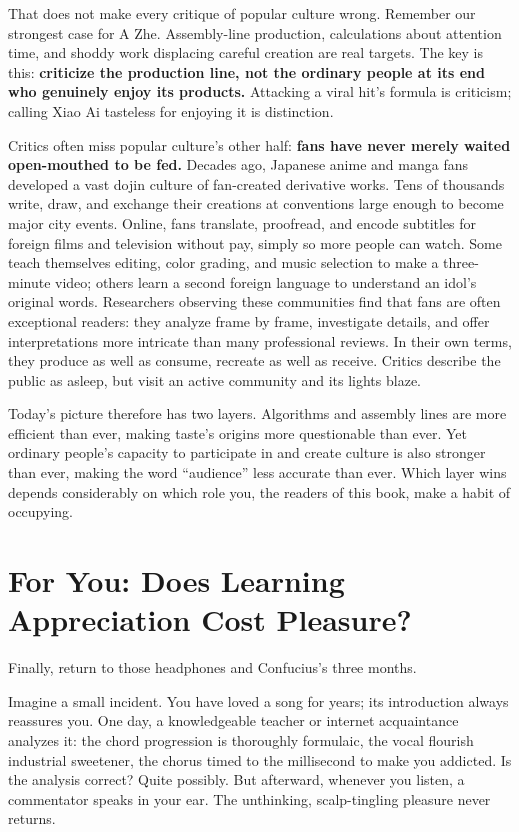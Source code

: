 That does not make every critique of popular culture wrong. Remember our strongest case for A Zhe. Assembly-line production, calculations about attention time, and shoddy work displacing careful creation are real targets. The key is this: \textbf{criticize the production line, not the ordinary people at its end who genuinely enjoy its products.} Attacking a viral hit's formula is criticism; calling Xiao Ai tasteless for enjoying it is distinction.

Critics often miss popular culture's other half: \textbf{fans have never merely waited open-mouthed to be fed.} Decades ago, Japanese anime and manga fans developed a vast dojin culture of fan-created derivative works. Tens of thousands write, draw, and exchange their creations at conventions large enough to become major city events. Online, fans translate, proofread, and encode subtitles for foreign films and television without pay, simply so more people can watch. Some teach themselves editing, color grading, and music selection to make a three-minute video; others learn a second foreign language to understand an idol's original words. Researchers observing these communities find that fans are often exceptional readers: they analyze frame by frame, investigate details, and offer interpretations more intricate than many professional reviews. In their own terms, they produce as well as consume, recreate as well as receive. Critics describe the public as asleep, but visit an active community and its lights blaze.

Today's picture therefore has two layers. Algorithms and assembly lines are more efficient than ever, making taste's origins more questionable than ever. Yet ordinary people's capacity to participate in and create culture is also stronger than ever, making the word ``audience'' less accurate than ever. Which layer wins depends considerably on which role you, the readers of this book, make a habit of occupying.

\section[Does Appreciation Cost Pleasure?]{For You: Does Learning Appreciation Cost Pleasure?}
Finally, return to those headphones and Confucius's three months.

Imagine a small incident. You have loved a song for years; its introduction always reassures you. One day, a knowledgeable teacher or internet acquaintance analyzes it: the chord progression is thoroughly formulaic, the vocal flourish industrial sweetener, the chorus timed to the millisecond to make you addicted. Is the analysis correct? Quite possibly. But afterward, whenever you listen, a commentator speaks in your ear. The unthinking, scalp-tingling pleasure never returns.

